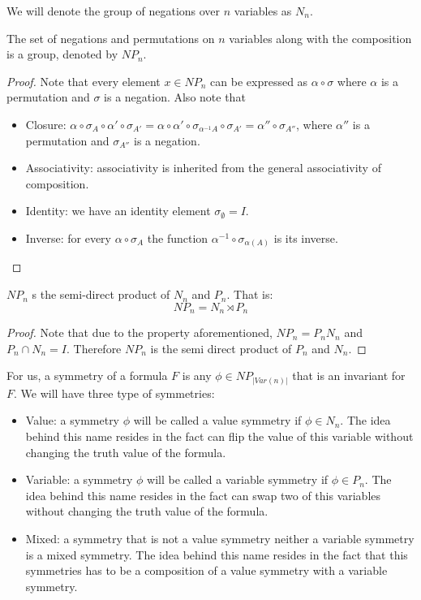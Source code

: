 We will denote the group of negations over $n$ variables as $N_n$.

\begin{proposition}[$NP_n$]
  The set of negations and permutations on $n$ variables  along with the composition is a group, denoted by $NP_n$. 
\end{proposition}
\begin{proof}
  Note that every element $x\in NP_n$ can be expressed as $\alpha\circ \sigma$ where $\alpha$ is a permutation and $\sigma$ is a negation. Also note that 
  \begin{itemize}
    \item Closure: $\alpha\circ \sigma_{A} \circ \alpha'\circ \sigma_{A'} = \alpha \circ \alpha' \circ \sigma_{\alpha^{-1} A} \circ \sigma_{A'}  = \alpha''\circ \sigma_{A''}$, where $\alpha''$ is a permutation and $\sigma_{A''}$ is a negation.
    \item Associativity: associativity is inherited from the general associativity of composition.
    \item Identity: we have an identity element $\sigma_{\emptyset}=I$.
    \item Inverse: for every $\alpha \circ \sigma_A$ the function $\alpha^{-1}\circ \sigma_{\alpha(A)}$ is its inverse.
  \end{itemize}
\end{proof}

\begin{proposition}
  $NP_n$ s the semi-direct product of $N_n$ and $P_n$. That is:
   $$NP_n = N_n \rtimes P_n$$
 \end{proposition}
 
\begin{proof}
Note that due to the property aforementioned, $NP_n = P_nN_n$ and $P_n\cap N_n = I$. Therefore $NP_n$ is the semi direct product of $P_n$ and $N_n$.
\end{proof}

For us, a symmetry of a formula $F$ is any $\phi\in NP_{|Var(n)|}$ that is an invariant for $F$. We will have three type of symmetries:
\begin{itemize}
\item Value: a symmetry $\phi$ will be called a value symmetry if $\phi \in N_n$. The idea behind this name resides in the fact can flip the value of this variable without changing the truth value of the formula.
\item Variable: a symmetry $\phi$ will be called a variable symmetry if $\phi \in P_n$. The idea behind this name resides in the fact can swap two of this variables without changing the truth value of the formula.
\item Mixed: a symmetry that is not a value symmetry neither a variable symmetry is a mixed symmetry. The idea behind this name resides in the fact that this symmetries has to be a composition of a value symmetry with a variable symmetry.
\end{itemize}





